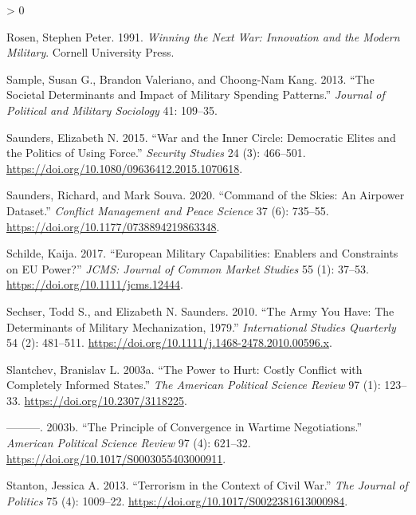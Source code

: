 \documentclass[
]{article}
\newlength{\cslhangindent}
\newenvironment{CSLReferences}[2] %
 {%
  \setlength{\parindent}{0pt}
  \ifodd #1 \everypar{\setlength{\hangindent}{\cslhangindent}}\ignorespaces\fi
  \ifnum #2 > 0
  \setlength{\parskip}{#2\baselineskip}
  \fi
 }%
 {}
\begin{document}
\begin{CSLReferences}{1}{0}
\leavevmode\hypertarget{ref-rosen_winningnextwar_1991}{}%
Rosen, Stephen Peter. 1991. \emph{Winning the {Next War}: {Innovation} and the {Modern Military}}. {Cornell University Press}.

\leavevmode\hypertarget{ref-sample_societaldeterminantsimpact_2013}{}%
Sample, Susan G., Brandon Valeriano, and Choong-Nam Kang. 2013. {``The Societal Determinants and Impact of Military Spending Patterns.''} \emph{Journal of Political and Military Sociology} 41: 109--35.

\leavevmode\hypertarget{ref-saunders_warinnercircle_2015}{}%
Saunders, Elizabeth N. 2015. {``War and the {Inner Circle}: {Democratic Elites} and the {Politics} of {Using Force}.''} \emph{Security Studies} 24 (3): 466--501. \url{https://doi.org/10.1080/09636412.2015.1070618}.

\leavevmode\hypertarget{ref-saunders_commandskiesairpower_2020}{}%
Saunders, Richard, and Mark Souva. 2020. {``Command of the {Skies}: {An Airpower Dataset}.''} \emph{Conflict Management and Peace Science} 37 (6): 735--55. \url{https://doi.org/10.1177/0738894219863348}.

\leavevmode\hypertarget{ref-schilde_europeanmilitarycapabilities_2017}{}%
Schilde, Kaija. 2017. {``European {Military Capabilities}: {Enablers} and {Constraints} on {EU Power}?''} \emph{JCMS: Journal of Common Market Studies} 55 (1): 37--53. \url{https://doi.org/10.1111/jcms.12444}.

\leavevmode\hypertarget{ref-sechser_armyyouhave_2010}{}%
Sechser, Todd S., and Elizabeth N. Saunders. 2010. {``The {Army You Have}: {The Determinants} of {Military Mechanization}, 1979{}.''} \emph{International Studies Quarterly} 54 (2): 481--511. \url{https://doi.org/10.1111/j.1468-2478.2010.00596.x}.

\leavevmode\hypertarget{ref-slantchev_powerhurtcostly_2003}{}%
Slantchev, Branislav L. 2003a. {``The {Power} to {Hurt}: {Costly Conflict} with {Completely Informed States}.''} \emph{The American Political Science Review} 97 (1): 123--33. \url{https://doi.org/10.2307/3118225}.

\leavevmode\hypertarget{ref-slantchev_principleconvergencewartime_2003}{}%
---------. 2003b. {``The {Principle} of {Convergence} in {Wartime Negotiations}.''} \emph{American Political Science Review} 97 (4): 621--32. \url{https://doi.org/10.1017/S0003055403000911}.

\leavevmode\hypertarget{ref-stanton_terrorismcontextcivil_2013}{}%
Stanton, Jessica A. 2013. {``Terrorism in the {Context} of {Civil War}.''} \emph{The Journal of Politics} 75 (4): 1009--22. \url{https://doi.org/10.1017/S0022381613000984}.


\end{CSLReferences}
\end{document}
